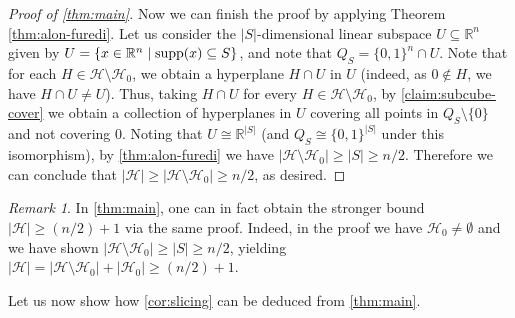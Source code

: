 \documentclass{amsart}
\theoremstyle{remark}
\newtheorem{remark}[theorem]{Remark}
\numberwithin{theorem}{section}
\renewcommand{\(}{\bigl(}
\renewcommand{\)}{\bigr)\vphantom{)}}
\newcommand{\cH}{\mathcal H}
\renewcommand{\ge}{\geqslant}
\newcommand{\bin}{\{0,1\}}
\newcommand{\supp}{\textup{supp}}
\begin{document}
\begin{proof}[Proof of \cref{thm:main}]
    

    Now we can finish the proof by applying Theorem \ref{thm:alon-furedi}. Let us consider the $|S|$-dimensional linear subspace $U\subseteq \mathbb{R}^n$ given by $U=\{x\in \mathbb{R}^n \mid \supp(x)\subseteq S\}$, and note that $Q_S=\bin^n\cap U$. Note that for each $H\in \cH\setminus \cH_0$, we obtain a hyperplane $H\cap U$ in $U$ (indeed, as $0\not\in H$, we have $H\cap U\ne U$).  Thus, taking $H\cap U$ for every $H\in \cH\setminus \cH_0$, by  \cref{claim:subcube-cover} we obtain a collection of hyperplanes in $U$ covering all points in $Q_S\setminus\{0\}$ and not covering $0$. Noting that $U\cong \mathbb{R}^{|S|}$ (and $Q_S\cong \bin^{|S|}$ under this isomorphism), by \cref{thm:alon-furedi} we have $|\cH\setminus \cH_0|\ge |S|\ge n/2$. Therefore we can conclude that $|\cH| \ge |\cH\setminus \cH_0|\ge n/2$, as desired.
\end{proof}

\begin{remark}
    In \cref{thm:main}, one can in fact obtain the stronger bound $|\cH|\ge (n/2)+1$ via the same proof. Indeed, in the proof we have $\cH_0\ne \emptyset$ and we have shown $|\cH\setminus \cH_0|\ge |S|\ge n/2$, yielding $|\cH| =|\cH\setminus \cH_0|+|\cH_0|\ge (n/2)+1$.
\end{remark}

Let us now show how \cref{cor:slicing} can be deduced from \cref{thm:main}. 
\end{document}
